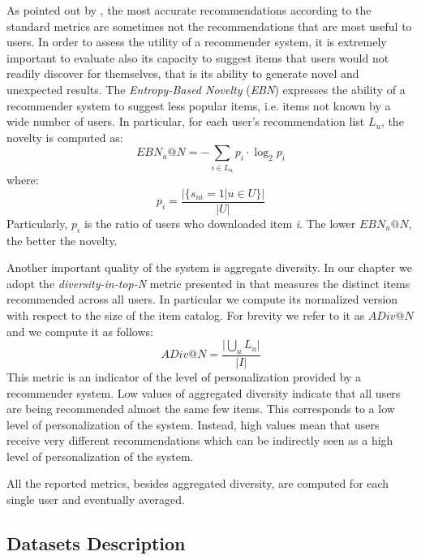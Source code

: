 As pointed out by \cite{McNee2006}, the most accurate recommendations according to the standard metrics are sometimes not the recommendations that are most useful to users. In order to assess the utility of a recommender system, it is extremely important to evaluate also its capacity to suggest items that users would not readily discover for themselves, that is its ability to generate novel and unexpected results.
The \textit{Entropy-Based Novelty} (\textit{EBN}) \citep{Bellogin2010} expresses the ability of a recommender system to suggest less popular items, i.e. items not known by a wide number of users. 
In particular, for each user's recommendation list $L_u$, the novelty is computed as:  
\[ EBN_u@N = - \sum \limits_{ i\in L_u} p_i \cdot \log_{2} p_i \]
where:
\[    p_i = \frac{ \vert \lbrace s_{ui}=1 \vert u \in U \rbrace \vert}{  \vert  U  \vert } \]
\noindent Particularly, $p_i$ is the ratio of users who downloaded item \textit{i}. The lower $EBN_u@N$, the better the novelty.

Another important quality of the system is aggregate diversity. 
In our chapter we adopt the \textit{diversity-in-top-N} metric presented in \cite{AdomaviciusK12} that measures the distinct items recommended across all users. In particular we compute its normalized version with respect to the size of the item catalog. For brevity we refer to it as $ADiv@N$ and we compute it as follows:
\[ ADiv@N = \frac{ \vert \bigcup_u L_u \vert }{ \vert I \vert }  \]
This metric is an indicator of the level of personalization provided by a recommender system. Low values of aggregated diversity indicate  that all users are being recommended almost the same few items. This corresponds to a low level of personalization of the system. Instead, high values mean that users receive very different recommendations which can be indirectly seen as a high level of personalization of the system. %

All the reported metrics, besides aggregated diversity, are computed for each single user and eventually averaged.

\subsection{Datasets Description}
\label{sec:graph-rec:datasets}

